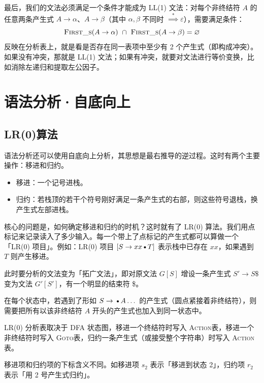 \documentclass[UTF8]{ctexart}
\newcommand\FIRSTS{\textsc{First\_s}}
\newcommand\ACTION{\textsc{Action}}
\newcommand\GOTO{\textsc{Goto}}
\newcommand\D{\text{\textbullet}}
\newcommand\deduce{\overset{*}{\implies}} %
\newcommand\Emph[1]{\textcolor{cyan!80!black}{#1}}
\begin{document}
最后，我们的文法必须满足一个条件才能成为 LL(1) 文法：对每个非终结符 $A$ 的任意两条产生式 $A\to\alpha$、$A\to\beta$（其中 $\alpha,\beta$ 不同时 $\deduce\varepsilon$），需要满足条件：
\begin{equation*}
    \FIRSTS(A\to\alpha)\ \cap\ \FIRSTS(A\to\beta) = \varnothing
\end{equation*}
反映在分析表上，就是看是否存在同一表项中至少有 2 个产生式（即构成冲突）。如果没有冲突，那就是 LL(1) 文法；如果有冲突，就要对文法进行等价变换，比如消除左递归和提取左公因子。




\section{语法分析·自底向上}
\subsection{LR(0)算法}
语法分析还可以使用自底向上分析，其思想是最右推导的逆过程。这时有两个主要操作：\Emph{移进}和\Emph{归约}。
\begin{itemize}[leftmargin=1cm]
  \item 移进：一个记号进栈。
  \item 归约：若栈顶的若干个符号刚好满足一条产生式的右部，则这些符号退栈，换产生式左部进栈。
\end{itemize}

核心的问题是，如何确定移进和归约的时机？这时就有了 \Emph{LR(0) 算法}。我们用点标记来记录读入了多少输入。每一个带上了点标记的产生式都可以算做一个「LR(0) 项目」。例如：LR(0) 项目 $[S\to xx\D T]$ 表示栈中已存在 $xx$，如果遇到 $T$ 则产生移进。

\begin{description}[leftmargin=1cm]
  \item[拓广文法] 此时要分析的文法变为「拓广文法」，即对原文法 $G[S]$ 增设一条产生式 $S'\to S\$ $ 变为文法 $G'[S']$，有一个明显的结束符 \$。
  \item[闭包计算] 在每个状态中，若遇到了形如 $S\to\D A\dots$ 的产生式（圆点紧接着非终结符），则需要把所有以该非终结符 $A$ 开头的产生式也加入到同一状态中。
  \item[分析表填写] LR(0) 分析表取决于 DFA 状态图，移进一个终结符时写入 \ACTION 表，移进一个非终结符时写入 \GOTO 表，归约一条产生式（或接受整个字符串）时写入 \ACTION 表。
  \item[下标含义] 移进项和归约项的下标含义不同。如移进项 $s_2$ 表示「移进到状态 2」，归约项 $r_2$ 表示「用 2 号产生式归约」。
\end{description}
\end{document}
